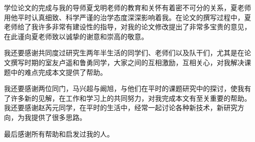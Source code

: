 

\begin{ack}
学位论文的完成与我的导师夏戈明老师的教育和关怀有着密不可分的关系，夏老师用他平时认真细致、科学严谨的治学态度深深影响着我。在论文的撰写过程中，夏老师给了我许多非常有建设性的指导，对我的论文修改提出了非常多宝贵的意见，在此谨向夏老师致以诚挚的谢意和崇高的敬意。

我还要感谢共同度过研究生两年半生活的同学们、老师们以及队干们，尤其是在论文撰写时期的室友卢遥和鲁勇同学，大家之间的互相激励，互相关心，对我解决课题中的难点完成本文提供了帮助。


我还要感谢两位同门，马兴超与阚旭，与他们在平时的课题研究中的探讨，使我有了许多新的见解，在工作和学习上的共同努力，对我完成本文有至关重要的帮助。我还要感谢赵芮元同学，在平时的生活中，经常一起讨论各种新技术，新研究方向，为我提供了很多思路。

最后感谢所有帮助和启发过我的人。

\end{ack}
